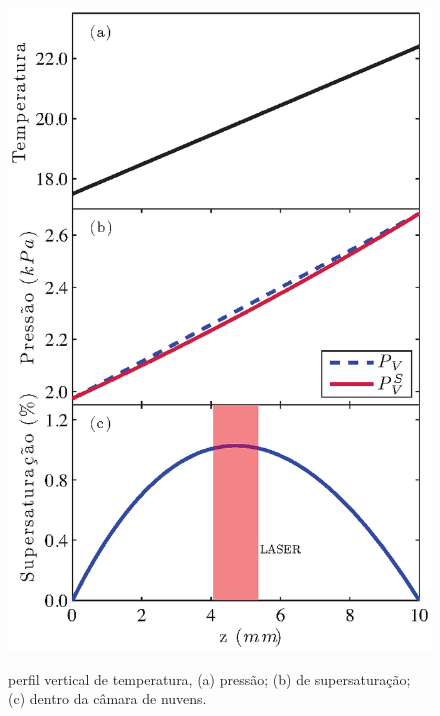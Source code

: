 \begin{figure}[hbt]
\begin{center}
\includegraphics[scale=0.8]{eps/figSaturacao.eps}\\
\end{center}
\caption{\label{perfil}\hspace{-0.1em} perfil vertical de temperatura, (a) press\~{a}o; (b) de supersatura\c{c}\~{a}o; (c) dentro da c\^{a}mara de nuvens.}
\end{figure}








